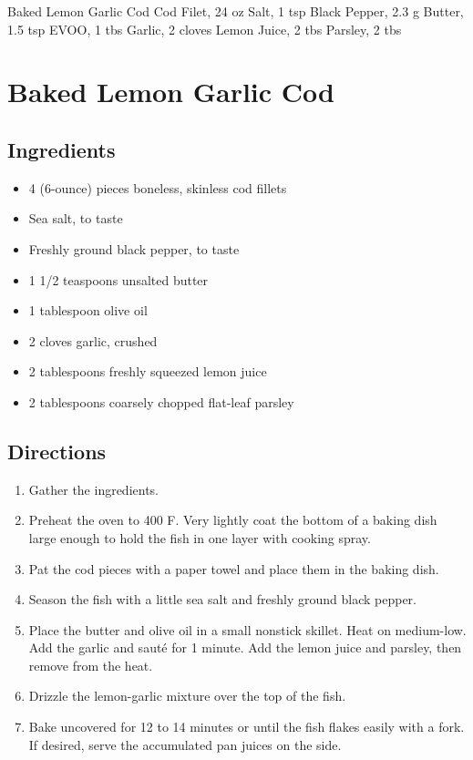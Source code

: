 Baked Lemon Garlic Cod
  Cod Filet, 24 oz
  Salt, 1 tsp
  Black Pepper, 2.3 g
  Butter, 1.5 tsp
  EVOO, 1 tbs
  Garlic, 2 cloves
  Lemon Juice, 2 tbs
  Parsley, 2 tbs
\section{ Baked Lemon Garlic Cod }

\subsection{ Ingredients }

\begin{itemize}
  \item 4 (6-ounce) pieces boneless, skinless cod fillets
  \item Sea salt, to taste
  \item Freshly ground black pepper, to taste 
  \item 1 1/2 teaspoons unsalted butter 
  \item 1 tablespoon olive oil 
  \item 2 cloves garlic, crushed 
  \item 2 tablespoons freshly squeezed lemon juice 
  \item 2 tablespoons coarsely chopped flat-leaf parsley 
\end{itemize}

\subsection{ Directions }

\begin{enumerate}
  \item Gather the ingredients. 
  \item Preheat the oven to 400 F. Very lightly coat the bottom of a baking dish large enough to hold the fish in one layer with cooking spray. 
  \item Pat the cod pieces with a paper towel and place them in the baking dish. 
  \item Season the fish with a little sea salt and freshly ground black pepper.
  \item Place the butter and olive oil in a small nonstick skillet. Heat on medium-low. Add the garlic and sauté for 1 minute. Add the lemon juice and parsley, then remove from the heat. 
  \item Drizzle the lemon-garlic mixture over the top of the fish.
  \item Bake uncovered for 12 to 14 minutes or until the fish flakes easily with a fork. If desired, serve the accumulated pan juices on the side.
\end{enumerate}

